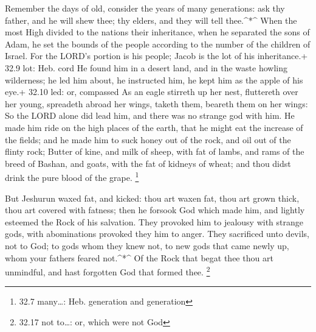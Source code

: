  Remember the days of old, consider the years of many
generations: ask thy father, and he will shew thee; thy elders, and they
will tell thee.\^{}*\^{}  When the most High divided to the
nations their inheritance, when he separated the sons of Adam, he set
the bounds of the people according to the number of the children of
Israel.  For the LORD's portion is his people; Jacob is the
lot of his inheritance.+ 32.9 lot: Heb. cord  He found him
in a desert land, and in the waste howling wilderness; he led him about,
he instructed him, he kept him as the apple of his eye.+ 32.10 led: or,
compassed  As an eagle stirreth up her nest, fluttereth
over her young, spreadeth abroad her wings, taketh them, beareth them on
her wings:  So the LORD alone did lead him, and there was
no strange god with him.  He made him ride on the high
places of the earth, that he might eat the increase of the fields; and
he made him to suck honey out of the rock, and oil out of the flinty
rock;  Butter of kine, and milk of sheep, with fat of
lambs, and rams of the breed of Bashan, and goats, with the fat of
kidneys of wheat; and thou didst drink the pure blood of the grape.
\footnote{32.7 many\ldots: Heb. generation and generation}

 But Jeshurun waxed fat, and kicked: thou art waxen fat,
thou art grown thick, thou art covered with fatness; then he forsook God
which made him, and lightly esteemed the Rock of his salvation.
 They provoked him to jealousy with strange gods, with
abominations provoked they him to anger.  They sacrificed
unto devils, not to God; to gods whom they knew not, to new gods that
came newly up, whom your fathers feared not.\^{}*\^{}  Of
the Rock that begat thee thou art unmindful, and hast forgotten God that
formed thee. \footnote{32.17 not to\ldots: or, which were not God}

